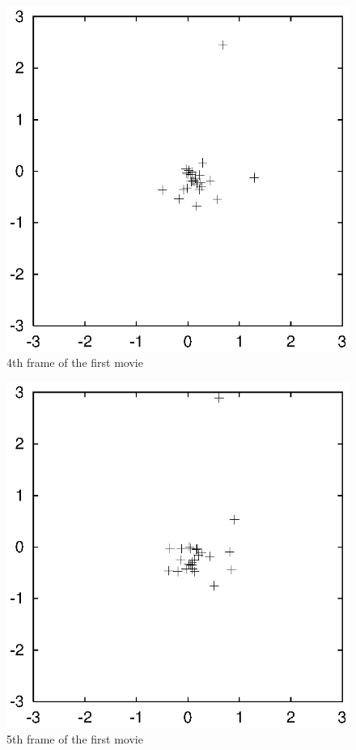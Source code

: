 \begin{figure}[htb]
\centering
\includegraphics[width=4.5in]{chap10/movietmp_nbody1.out.3.ps}
\caption[4th frame of movie \#1]
{4th frame of the first movie}
\label{fig:movie1.4}
\end{figure}

\begin{figure}[htb]
\centering
\includegraphics[width=4.5in]{chap10/movietmp_nbody1.out.4.ps}
\caption[5th frame of movie \#1]
{5th frame of the first movie}
\label{fig:movie1.5}
\end{figure}

